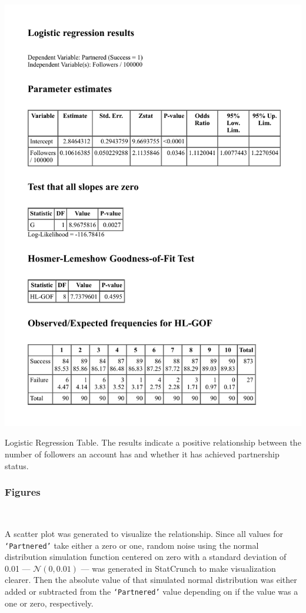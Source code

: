 \documentclass[12pt]{article}
\begin{document}
\begin{table}[H]
  \centering %
  \includegraphics[scale=0.9]{../StatCrunch_Results/logit_partnered_followers/table}
  \captionsetup{justification=centering, singlelinecheck=false, margin=2cm}
  \caption[Logistic Regression: Predict Partnered Status by Number of Followers]{Logistic Regression Table. The results indicate a positive relationship between the number of followers an account has and whether it has achieved partnership status.}
  \label{tab:logistic_table}
\end{table}

\subsubsection{Figures}\

A scatter plot was generated to visualize the relationship. Since all values for \texttt{`Partnered'} take either a zero or one, random noise using the normal distribution simulation function centered on zero with a standard deviation of 0.01 --- $\mathcal{N}(0, 0.01)$ --- was generated in StatCrunch to make visualization clearer. Then the absolute value of that simulated normal distribution was either added or subtracted from the \texttt{`Partnered'} value depending on if the value was a one or zero, respectively. 
\end{document}
